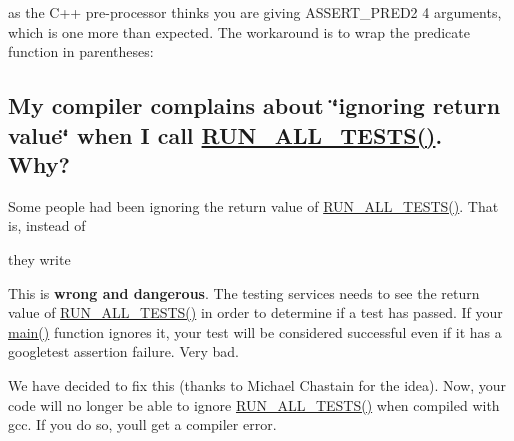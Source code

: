 \begin{DoxyCode}{0}
\end{DoxyCode}


as the C++ pre-\/processor thinks you are giving {\ttfamily A\+S\+S\+E\+R\+T\+\_\+\+P\+R\+E\+D2} 4 arguments, which is one more than expected. The workaround is to wrap the predicate function in parentheses\+:


\begin{DoxyCode}{0}
\end{DoxyCode}


\subsection*{My compiler complains about \char`\"{}ignoring return value\char`\"{} when I call \mbox{\hyperlink{googletest-master_2googletest_2include_2gtest_2gtest_8h_a853a3792807489591d3d4a2f2ff9359f}{R\+U\+N\+\_\+\+A\+L\+L\+\_\+\+T\+E\+S\+T\+S()}}. Why?}

Some people had been ignoring the return value of {\ttfamily \mbox{\hyperlink{googletest-master_2googletest_2include_2gtest_2gtest_8h_a853a3792807489591d3d4a2f2ff9359f}{R\+U\+N\+\_\+\+A\+L\+L\+\_\+\+T\+E\+S\+T\+S()}}}. That is, instead of


\begin{DoxyCode}{0}
\end{DoxyCode}


they write


\begin{DoxyCode}{0}
\end{DoxyCode}


This is {\bfseries{wrong and dangerous}}. The testing services needs to see the return value of {\ttfamily \mbox{\hyperlink{googletest-master_2googletest_2include_2gtest_2gtest_8h_a853a3792807489591d3d4a2f2ff9359f}{R\+U\+N\+\_\+\+A\+L\+L\+\_\+\+T\+E\+S\+T\+S()}}} in order to determine if a test has passed. If your {\ttfamily \mbox{\hyperlink{_be_01vektoriaus_2main_8cpp_ae66f6b31b5ad750f1fe042a706a4e3d4}{main()}}} function ignores it, your test will be considered successful even if it has a googletest assertion failure. Very bad.

We have decided to fix this (thanks to Michael Chastain for the idea). Now, your code will no longer be able to ignore {\ttfamily \mbox{\hyperlink{googletest-master_2googletest_2include_2gtest_2gtest_8h_a853a3792807489591d3d4a2f2ff9359f}{R\+U\+N\+\_\+\+A\+L\+L\+\_\+\+T\+E\+S\+T\+S()}}} when compiled with {\ttfamily gcc}. If you do so, you\textquotesingle{}ll get a compiler error.

